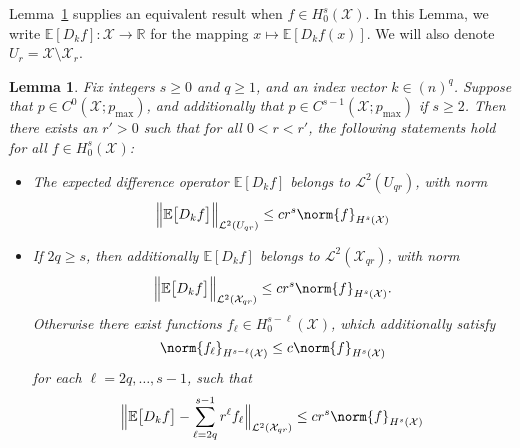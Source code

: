 \documentclass{article}
\newcommand{\Reals}{\mathbb{R}}
\newcommand{\1}{\mathbf{1}}
\newcommand{\Xset}{\mathcal{X}}
\newcommand{\Leb}{\mathcal{L}}
\newcommand{\Ebb}{\mathbb{E}}
\theoremstyle{alden}
\theoremstyle{aldenthm}
\newtheorem{lemma}{Lemma}
\theoremstyle{definition}
\theoremstyle{remark}
\begin{document}
Lemma~\ref{lem:leading_term_sobolev_compact} supplies an equivalent result when $f \in H_0^{s}(\Xset)$. In this Lemma, we write $\Ebb[D_kf]:\Xset \to \Reals$ for the mapping $x \mapsto \Ebb[D_kf(x)]$. We will also denote $U_r = \Xset \setminus \Xset_{r}$.
\begin{lemma}
	\label{lem:leading_term_sobolev_compact}
	Fix integers $s \geq 0$ and $q \geq 1$, and an index vector $k \in (n)^q$. Suppose that $p \in C^0(\Xset;p_{\max})$, and additionally that $p \in C^{s-1}(\Xset;p_{\max})$ if $s \geq 2$. Then there exists an $r' > 0$ such that for all $0 < r < r'$, the following statements hold for all $f \in H_0^{s}(\Xset)$:
	\begin{itemize}
		\item The expected difference operator $\Ebb[D_kf]$ belongs to $\Leb^2(U_{qr})$, with norm
		\begin{equation}
		\label{eqn:leading_term_sobolev_compact_1}
		\Bigl\|\Ebb\bigl[D_kf\bigr]\Bigr\|_{\Leb^2(U_{qr})} \leq c r^s \norm{f}_{H^s(\Xset)}
		\end{equation}
		\item If $2q \geq s$, then additionally $\Ebb[D_kf]$ belongs to $\Leb^2(\Xset_{qr})$, with norm
		\begin{equation}
		\label{eqn:leading_term_sobolev_compact_2}
		\Bigl\|\Ebb\bigl[D_kf\bigr]\Bigr\|_{\Leb^2(\Xset_{qr})} \leq c r^s \norm{f}_{H^s(\Xset)}.
		\end{equation}
		Otherwise there exist functions $f_{\ell} \in H_0^{s - \ell}(\Xset)$, which additionally satisfy
		\begin{equation}
		\label{eqn:leading_term_sobolev_compact_3}
		\norm{f_{\ell}}_{H^{s - \ell}(\Xset)} \leq c \norm{f}_{H^s(\Xset)}
		\end{equation}
		for each $\ell = 2q,\ldots,s-1$, such that
		\begin{equation}
		\label{eqn:leading_term_sobolev_compact_4}
		\Bigl\|\Ebb\bigl[D_kf\bigr] - \sum_{\ell = 2q}^{s - 1} r^{\ell} f_{\ell}\Bigr\|_{\Leb^2(\Xset_{qr})} \leq c r^s \norm{f}_{H^s(\Xset)}
		\end{equation}
	\end{itemize}
\end{lemma}
\end{document}

